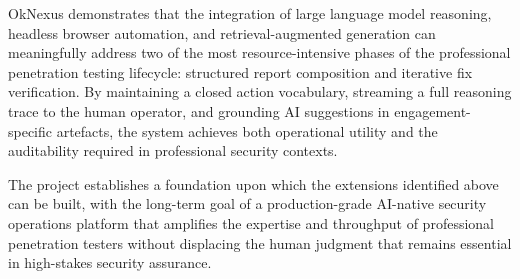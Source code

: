 OkNexus demonstrates that the integration of large language model reasoning, headless browser automation, and retrieval-augmented generation can meaningfully address two of the most resource-intensive phases of the professional penetration testing lifecycle: structured report composition and iterative fix verification. By maintaining a closed action vocabulary, streaming a full reasoning trace to the human operator, and grounding AI suggestions in engagement-specific artefacts, the system achieves both operational utility and the auditability required in professional security contexts.

The project establishes a foundation upon which the extensions identified above can be built, with the long-term goal of a production-grade AI-native security operations platform that amplifies the expertise and throughput of professional penetration testers without displacing the human judgment that remains essential in high-stakes security assurance.
